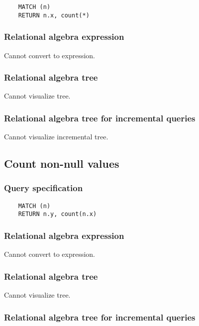 	\begin{lstlisting}
	MATCH (n)
	RETURN n.x, count(*)
	\end{lstlisting}


	\subsubsection*{Relational algebra expression}

	Cannot convert to expression.

	\subsubsection*{Relational algebra tree}

	Cannot visualize tree.

	\subsubsection*{Relational algebra tree for incremental queries}

	Cannot visualize incremental tree.
	\subsection{Count non-null values}

	\subsubsection*{Query specification}

	\begin{lstlisting}
	MATCH (n)
	RETURN n.y, count(n.x)
	\end{lstlisting}


	\subsubsection*{Relational algebra expression}

	Cannot convert to expression.

	\subsubsection*{Relational algebra tree}

	Cannot visualize tree.

	\subsubsection*{Relational algebra tree for incremental queries}

